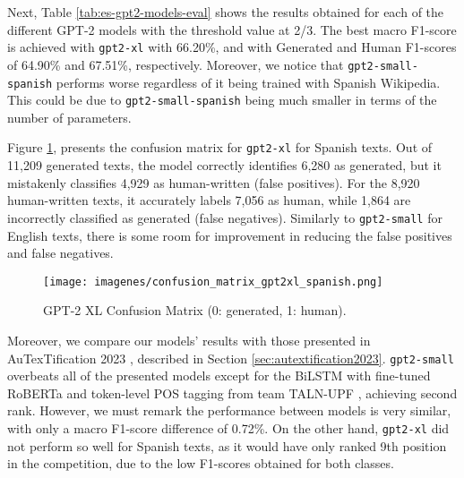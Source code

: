\documentclass[a4paper,11pt,twocolumn,twoside]{article}
\begin{document}
Next, Table \ref{tab:es-gpt2-models-eval} shows the results obtained for each of the different GPT-2 models with the threshold value at 2/3. The best macro F1-score is achieved with \texttt{gpt2-xl} with 66.20\%, and with Generated and Human F1-scores of 64.90\% and 67.51\%, respectively. Moreover, we notice that \texttt{gpt2-small-spanish} performs worse regardless of it being trained with Spanish Wikipedia. This could be due to \texttt{gpt2-small-spanish} being much smaller in terms of the number of parameters.
\begin{table}[!h]
    \centering
    \caption{GPT-2 models with threshold 2/3 F1-scores (subtask 1 for Spanish).}
    \label{tab:es-gpt2-models-eval}
\end{table}

Figure \ref{fig:confusion_matrix_gpt2xl_spanish}, presents the confusion matrix for \texttt{gpt2-xl} for Spanish texts. Out of 11,209 generated texts, the model correctly identifies 6,280 as generated, but it mistakenly classifies 4,929 as human-written (false positives). For the 8,920 human-written texts, it accurately labels 7,056 as human, while 1,864 are incorrectly classified as generated (false negatives). Similarly to \texttt{gpt2-small} for English texts, there is some room for improvement in reducing the false positives and false negatives.
\begin{figure}
    \centering
    \texttt{[image: imagenes/confusion\_matrix\_gpt2xl\_spanish.png]}
    \caption{GPT-2 XL Confusion Matrix (0:
generated, 1: human).}
    \label{fig:confusion_matrix_gpt2xl_spanish}
\end{figure}

Moreover, we compare our models' results with those presented in AuTexTification 2023 \cite{autextification}, described in Section \ref{sec:autextification2023}. \texttt{gpt2-small} overbeats all of the presented models except for the BiLSTM with fine-tuned RoBERTa and token-level POS tagging from team TALN-UPF \cite{taln-upf2023bilstm}, achieving second rank. However, we must remark the performance between models is very similar, with only a macro F1-score difference of 0.72\%.
On the other hand, \texttt{gpt2-xl} did not perform so well for Spanish texts, as it would have only ranked 9th position in the competition, due to the low F1-scores obtained for both classes.
\end{document}
